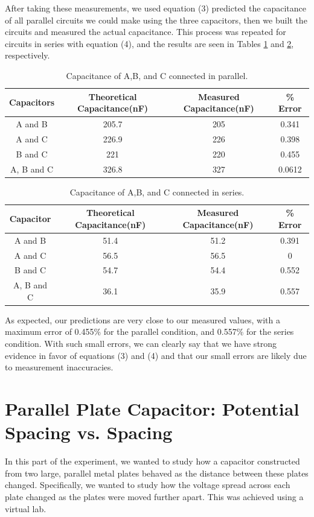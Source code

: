 \documentclass[oneside,12pt]{amsart}
\begin{document}
	\indent After taking these measurements, we used equation (3) predicted the capacitance of all parallel circuits we could make using the three capacitors, then we built the circuits and measured the actual capacitance. This process was repeated for circuits in series with equation (4), and the results are seen in Tables \ref{inParallel} and \ref{inSeries}, respectively. 
	\begin{table}[H]
		\begin{tabular}{ |c|c|c|c|}
			\hline
			Capacitors & Theoretical Capacitance(nF)& Measured Capacitance(nF) &\% Error\\
			\hline
			A and B	&205.7&205&0.341\\
			A and C&226.9 & 226&0.398\\
			B and C&221&220&0.455\\
			A, B and C&326.8&327&0.0612\\
			\hline
		\end{tabular}
		\caption{Capacitance of A,B, and C connected in parallel.}
		\label{inParallel}
	\end{table}

\begin{table}[H]
	\begin{tabular}{ |c|c|c|c|}
		\hline
		Capacitor & Theoretical Capacitance(nF)& Measured Capacitance(nF) &\% Error\\
		\hline
		A and B&51.4&51.2&0.391\\
		A and C&56.5&56.5&0\\
		B and C&54.7&54.4&0.552\\
		A, B and C&36.1&35.9&0.557\\
		\hline
	\end{tabular}
	\caption{Capacitance of A,B, and C connected in series.}
	\label{inSeries}
\end{table}
	
	As expected, our predictions are very close to our measured values, with a maximum error of 0.455\% for the parallel condition, and 0.557\% for the series condition. With such small errors, we can clearly say that we have strong evidence in favor of equations (3) and (4) and that our small errors are likely due to measurement inaccuracies. 

	
\section{Parallel Plate Capacitor: Potential Spacing vs. Spacing}
	In this part of the experiment, we wanted to study how a capacitor constructed from two large, parallel metal plates behaved as the distance between these plates changed. Specifically, we wanted to study how the voltage spread across each plate changed as the plates were moved further apart. This was achieved using a virtual lab.\\
	
\end{document}
